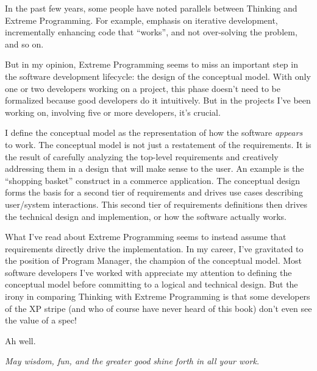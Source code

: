 In the past few years, some people have noted parallels between
Thinking \Forth{} and Extreme Programming. For example, emphasis on
iterative development, incrementally enhancing code that ``works'', and
not over-solving the problem, and so on.

But in my opinion, Extreme Programming seems to miss an important step
in the software development lifecycle: the design of the conceptual
model. With only one or two developers working on a project, this
phase doesn't need to be formalized because good developers do it
intuitively. But in the projects I've been working on, involving five
or more developers, it's crucial.

I define the conceptual model as the representation of how the
software \emph{appears} to work. The conceptual model is not just a
restatement of the requirements. It is the result of carefully
analyzing the top-level requirements and creatively addressing them in
a design that will make sense to the user. An example is the ``shopping
basket'' construct in a commerce application. The conceptual design
forms the basis for a second tier of requirements and drives use cases
describing user/system interactions. This second tier of requirements
definitions then drives the technical design and implemention, or how
the software actually works.

What I've read about Extreme Programming seems to instead assume that
requirements directly drive the implementation. In my career, I've
gravitated to the position of Program Manager, the champion of the
conceptual model. Most software developers I've worked with appreciate
my attention to defining the conceptual model before committing to a
logical and technical design. But the irony in comparing Thinking
\Forth{} with Extreme Programming is that some developers of the XP
stripe (and who of course have never heard of this book) don't even
see the value of a spec!

Ah well.

\begin{flushright}
\emph{May wisdom, fun, and the greater good shine forth in all your work.}

\vspace{2.5em}
\end{flushright}

